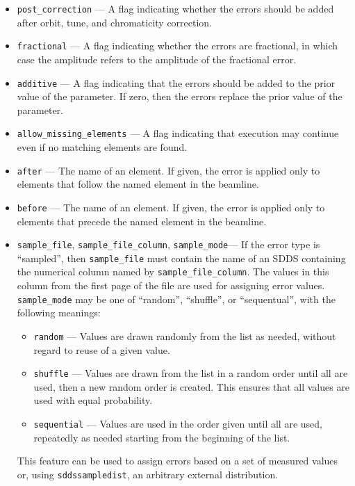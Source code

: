 \documentclass[11pt]{article}
\begin{document}
\begin{itemize}
\item \verb|post_correction| --- A flag indicating whether the errors should be added after orbit, tune, and chromaticity correction.
\item \verb|fractional| --- A flag indicating whether the errors are fractional, in which case the amplitude refers to
the amplitude of the fractional error.
\item \verb|additive| --- A flag indicating that the errors should be added to the prior value of the
parameter.  If zero, then the errors replace the prior value of the parameter.
\item \verb|allow_missing_elements| --- A flag indicating that execution may continue even if no matching elements are found.
\item \verb|after| --- The name of an element.  If given, the error is applied only to elements
 that follow the named element in the beamline.
\item \verb|before| --- The name of an element.  If given, the error is applied only to elements
 that precede the named element in the beamline.

\item \verb|sample_file|, \verb|sample_file_column|, \verb|sample_mode|---
  If the error type is ``sampled'', then \verb|sample_file| must contain the name of an SDDS containing the numerical column
  named by \verb|sample_file_column|. The values in this column from the first page of the file are used for assigning
  error values. \verb|sample_mode| may be one of ``random'', ``shuffle'', or ``sequentual'', with the following meanings:
  \begin{itemize}
    \item \verb|random| --- Values are drawn randomly from the list as needed, without regard to reuse of a given value.
    \item \verb|shuffle| --- Values are drawn from the list in a random order until all are used, then a new random order
      is created. This ensures that all values are used with equal probability.
    \item \verb|sequential| --- Values are used in the order given until all are used, repeatedly as needed starting from
      the beginning of the list.
  \end{itemize}
  This feature can be used to assign errors based on a set of measured values or, using \verb|sddssampledist|, an arbitrary
  external distribution.
\end{itemize}
\end{document}

